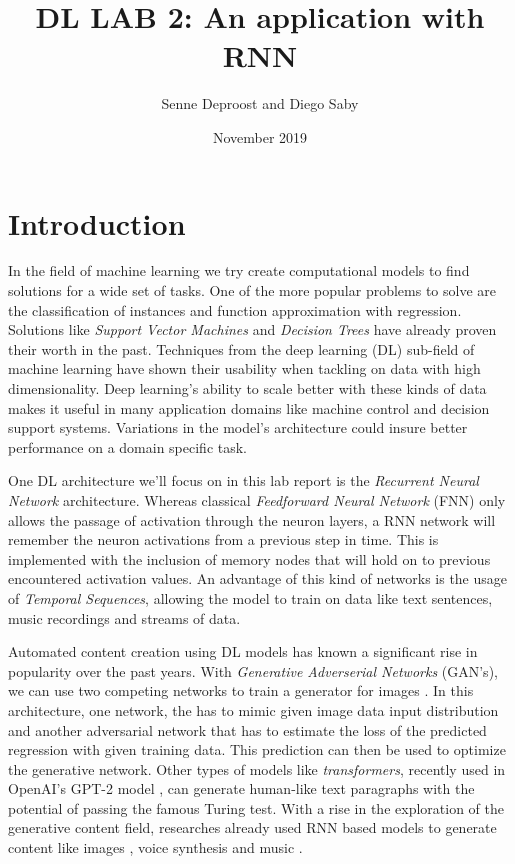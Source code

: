 \documentclass[11pt]
{article}
\title{DL LAB 2: An application with RNN}
\author{Senne Deproost and Diego Saby}
\date{November 2019}
\begin{document}
\maketitle
\section{Introduction}
In the field of machine learning we try create computational models to find solutions for a wide set of tasks. One of the more popular problems to solve are the classification of instances and function approximation with regression. Solutions like \textit{Support Vector Machines} and \textit{Decision Trees} have already proven their worth in the past. Techniques from the deep learning (DL) sub-field of machine learning have shown their usability when tackling on data with high dimen\-sionality. Deep learning's ability to scale better with these kinds of data makes it useful in many application domains like machine control and decision support systems. Variations in the model's architecture could insure better performance on a domain specific task.

One DL architecture we'll focus on in this lab report is the \textit{Recurrent Neural Network} architecture. Whereas classical \textit{Feedforward Neural Network} (FNN) only allows the passage of activation through the neuron layers, a RNN network will remember the neuron activations from a previous step in time. This is implemented with the inclusion of memory nodes that will hold on to previous encountered activation values. An advantage of this kind of networks is the usage of \textit{Temporal Sequences}, allowing the model to train on data like text sentences, music recordings and streams of data.

Automated content creation using DL models has known a significant rise in popularity over the past years. With \textit{Generative Adverserial Networks} (GAN's), we can use two competing networks to train a generator for images \cite{Goodfellow2014}. In this architecture, one network, the has to mimic given image data input distribution and another adversarial network that has to estimate the loss of the predicted regression with given training data. This prediction can then be used to optimize the generative network. Other types of models like \textit{transformers}, recently used in OpenAI's GPT-2 model \cite{Radford}, can generate human-like text paragraphs with the potential of passing the famous Turing test. With a rise in the exploration of the generative content field, researches already used RNN based models to generate content like images \cite{Gregor}, voice synthesis \cite{Oord2016,VanDenOord2016} and music \cite{Oord2016}.
\end{document}
